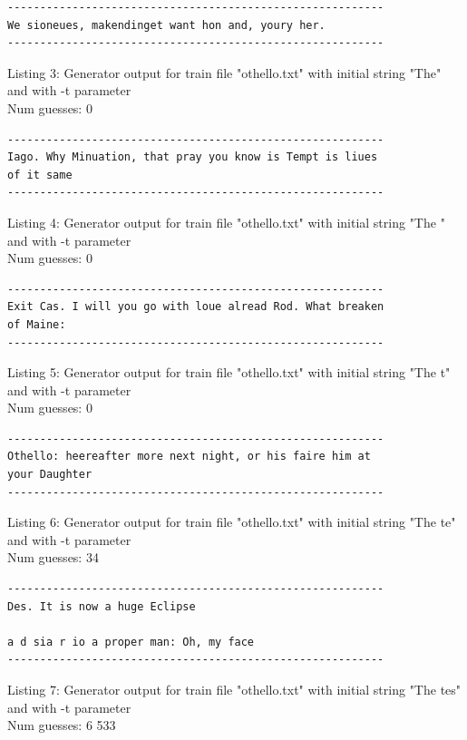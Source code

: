 \documentclass{article}
\begin{document}
\begin{lstlisting}
----------------------------------------------------------
We sioneues, makendinget want hon and, youry her.
----------------------------------------------------------
\end{lstlisting}

Listing 3: Generator output for train file "othello.txt" with initial string "The" and with -t parameter
\\Num guesses: 0

\begin{lstlisting}
----------------------------------------------------------
Iago. Why Minuation, that pray you know is Tempt is liues 
of it same
----------------------------------------------------------
\end{lstlisting}

Listing 4: Generator output for train file "othello.txt" with initial string "The " and with -t parameter
\\Num guesses: 0

\begin{lstlisting}
----------------------------------------------------------
Exit Cas. I will you go with loue alread Rod. What breaken 
of Maine:
----------------------------------------------------------
\end{lstlisting}

Listing 5: Generator output for train file "othello.txt" with initial string "The t" and with -t parameter
\\Num guesses: 0

\begin{lstlisting}
----------------------------------------------------------
Othello: heereafter more next night, or his faire him at 
your Daughter
----------------------------------------------------------
\end{lstlisting}

Listing 6: Generator output for train file "othello.txt" with initial string "The te" and with -t parameter
\\Num guesses: 34

\begin{lstlisting}
----------------------------------------------------------
Des. It is now a huge Eclipse

a d sia r io a proper man: Oh, my face 
----------------------------------------------------------
\end{lstlisting}

Listing 7: Generator output for train file "othello.txt" with initial string "The tes" and with -t parameter
\\Num guesses: 6 533
\end{document}
